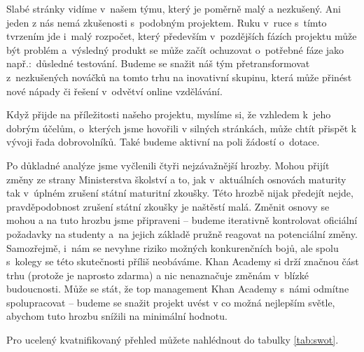 \documentclass[12pt, a4paper]{report}
\begin{document}
Slabé stránky vidíme v našem týmu, který je poměrně malý a nezkušený. Ani jeden
z nás nemá zkušenosti s podobným projektem. Ruku v ruce s tímto tvrzením jde
i malý rozpočet, který především v pozdějších fázích projektu může být problém
a výsledný produkt se může začít ochuzovat o potřebné fáze jako např.: důsledné
testování. Budeme se snažit náš tým přetransformovat z nezkušených nováčků na
tomto trhu na inovativní skupinu, která může přinést nové nápady či řešení
v odvětví online vzdělávání.

Když přijde na příležitosti našeho projektu, myslíme si, že vzhledem k jeho
dobrým účelům, o kterých jsme hovořili v silných stránkách, může chtít přispět k
vývoji řada dobrovolníků. Také budeme aktivní na poli žádostí o dotace.

Po důkladné analýze jsme vyčlenili čtyři nejzávažnější hrozby. Mohou přijít
změny ze strany Ministerstva školství a to, jak v aktuálních osnovách maturity
tak v úplném zrušení státní maturitní zkoušky. Této hrozbě nijak předejít nejde,
pravděpodobnost zrušení státní zkoušky je naštěstí malá. Změnit osnovy se mohou
a na tuto hrozbu jsme připraveni -- budeme iterativně kontrolovat oficiální
požadavky na studenty a na jejich základě pružně reagovat na potenciální změny.
Samozřejmě, i nám se nevyhne riziko možných konkurenčních bojů, ale spolu
s kolegy se této skutečnosti příliš neobáváme. Khan Academy si drží značnou část
trhu (protože je naprosto zdarma) a nic nenaznačuje změnám v blízké budoucnosti.
Může se stát, že top management Khan Academy s námi odmítne spolupracovat --
budeme se snažit projekt uvést v co možná nejlepším světle, abychom tuto hrozbu
snížili na minimální hodnotu.

Pro ucelený kvatnifikovaný přehled můžete nahlédnout do tabulky \ref{tab:swot}.
\end{document}
